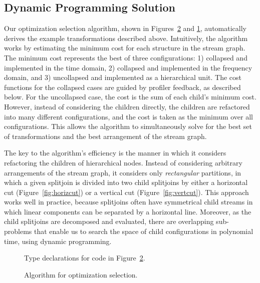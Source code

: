 \subsection{Dynamic Programming Solution}

Our optimization selection algorithm, shown in
Figures~\ref{fig:part-alg} and \ref{fig:part-decl}, automatically
derives the example transformations described above.  Intuitively, the
algorithm works by estimating the minimum cost for each structure in
the stream graph. The minimum cost represents the best of three
configurations: 1) collapsed and implemented in the time domain, 2)
collapsed and implemented in the frequency domain, and 3) uncollapsed
and implemented as a hierarchical unit.  The cost functions for the
collapsed cases are guided by profiler feedback, as described below.
For the uncollapsed case, the cost is the sum of each child's minimum
cost.  However, instead of considering the children directly, the
children are refactored into many different configurations, and the
cost is taken as the minimum over all configurations.  This allows the
algorithm to simultaneously solve for the best set of transformations
and the best arrangement of the stream graph.

The key to the algorithm's efficiency is the manner in which it
considers refactoring the children of hierarchical nodes.  Instead of
considering arbitrary arrangements of the stream graph, it considers
only {\it rectangular} partitions, in which a given splitjoin is
divided into two child splitjoins by either a horizontal cut
(Figure~\ref{fig:horizcut}) or a vertical cut
(Figure~\ref{fig:vertcut}).  This approach works well in practice,
because splitjoins often have symmetrical child streams in which
linear components can be separated by a horizontal line.  Moreover, as
the child splitjoins are decomposed and evaluated, there are
overlapping sub-problems that enable us to search the space of child
configurations in polynomial time, using dynamic programming.

\begin{figure}[t]
  \caption{Type declarations for code in Figure~\ref{fig:part-alg}.
  \protect\label{fig:part-decl}}
\end{figure}

\begin{figure}[t]
  \caption{Algorithm for optimization selection.
  \protect\label{fig:part-alg}}
\end{figure}

